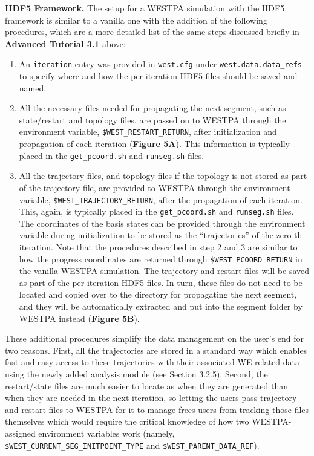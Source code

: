 \textbf{HDF5 Framework.} The setup for a WESTPA simulation with the HDF5 framework is similar to a vanilla one with the addition of the following procedures, which are a more detailed list of the same steps discussed briefly in \textbf{Advanced Tutorial 3.1} above:
\begin{enumerate}
    \item An \verb|iteration| entry was provided in \verb|west.cfg| under \verb|west.data.data_refs| to specify where and how the per-iteration HDF5 files should be saved and named. 
    \item All the necessary files needed for propagating the next segment, such as state/restart and topology files, are passed on to WESTPA through the environment variable, \verb|$WEST_RESTART_RETURN|, after initialization and propagation of each iteration (\textbf{Figure 5A}). 
    This information is typically placed in the \verb|get_pcoord.sh| and \verb|runseg.sh| files. 
    \item All the trajectory files, and topology files if the topology is not stored as part of the trajectory file, are provided to WESTPA through the environment variable, \verb|$WEST_TRAJECTORY_RETURN|, after the propagation of each iteration. 
    This, again, is typically placed in the \verb|get_pcoord.sh| and \verb|runseg.sh| files. 
    The coordinates of the basis states can be provided through the environment variable during initialization to be stored as the “trajectories” of the zero-th iteration. 
    Note that the procedures described in step 2 and 3 are similar to how the progress coordinates are returned through \verb|$WEST_PCOORD_RETURN| in the vanilla WESTPA simulation. 
    The trajectory and restart files will be saved as part of the per-iteration HDF5 files. 
    In turn, these files do not need to be located and copied over to the directory for propagating the next segment, and they will be automatically extracted and put into the segment folder by WESTPA instead (\textbf{Figure 5B}).
\end{enumerate}

These additional procedures simplify the data management on the user’s end for two reasons. 
First, all the trajectories are stored in a standard way which enables fast and easy access to these trajectories with their associated WE-related data using the newly added analysis module (see Section 3.2.5). 
Second, the restart/state files are much easier to locate as when they are generated than when they are needed in the next iteration, so letting the users pass trajectory and restart files to WESTPA for it to manage frees users from tracking those files themselves which would require the critical knowledge of how two WESTPA-assigned environment variables work (namely, \verb|$WEST_CURRENT_SEG_INITPOINT_TYPE| and \verb|$WEST_PARENT_DATA_REF|). 

